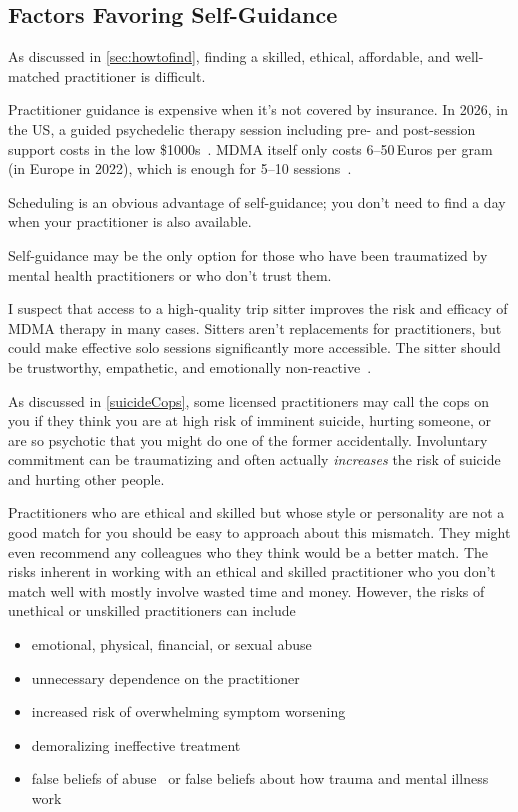 \documentclass[11pt,oneside]{book}
\let\cite\parencite
\begin{document}
\subsection*{Factors Favoring Self-Guidance}
As discussed in \cref{sec:howtofind}, finding a skilled, ethical, affordable, and well-matched practitioner is difficult.

Practitioner guidance is expensive when it's not covered by insurance. In 2026, in the US, a guided psychedelic therapy session including pre- and post-session support costs in the low \$1000s~\cite{cost1,cost2,cost3}. MDMA itself only costs 6--50\,Euros per gram (in Europe in 2022), which is enough for 5--10 sessions~\cite{euMDMA}.

Scheduling is an obvious advantage of self-guidance; you don't need to find a day when your practitioner is also available.

Self-guidance may be the only option for those who have been traumatized by mental health practitioners or who don't trust them.

I suspect that access to a high-quality trip sitter improves the risk and efficacy of MDMA therapy in many cases. Sitters aren't replacements for practitioners, but could make effective solo sessions significantly more accessible. The sitter should be trustworthy, empathetic, and emotionally non-reactive~\cite{thalSitter}.

As discussed in \cref{suicideCops}, some licensed practitioners may call the cops on you if they think you are at high risk of imminent suicide, hurting someone, or are so psychotic that you might do one of the former accidentally. Involuntary commitment can be traumatizing and often actually \textit{increases} the risk of suicide and hurting other people.

Practitioners who are ethical and skilled but whose style or personality are not a good match for you should be easy to approach about this mismatch. They might even recommend any colleagues who they think would be a better match. The risks inherent in working with an ethical and skilled practitioner who you don't match well with mostly involve wasted time and money. However, the risks of unethical or unskilled practitioners can include
\begin{itemize}
    \item emotional, physical, financial, or sexual abuse
    \item unnecessary dependence on the practitioner
    \item increased risk of overwhelming symptom worsening
    \item demoralizing ineffective treatment
    \item false beliefs of abuse~\cite{Scoboria07022017} or false beliefs about how trauma and mental illness work
\end{itemize}
\end{document}
